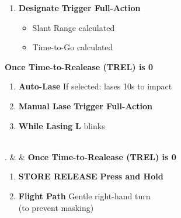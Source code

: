 \documentclass[fontInter]{TechCheck}
\begin{document}
\begin{listlongtable}
		\begin{minipage}[t]{\linewidth}
			\vspace{-7pt}
			\begin{enumerate}
				\item \textbf{Designate} \dotfill \textbf{Trigger Full-Action}
				\begin{itemize}
					\item Slant Range calculated
					\item Time-to-Go calculated
				\end{itemize}
			\end{enumerate}
			\textbf{Once Time-to-Realease (TREL) is 0}
			\begin{enumerate}[label=(\alph*), resume]
				\item \textbf{Auto-Lase} \dotfill If selected: lases 10s to impact
				\item \textbf{Manual Lase} \dotfill \textbf{Trigger Full-Action}
				\item \textbf{While Lasing} \dotfill \textbf{L} blinks
			\end{enumerate}
		\end{minipage} \\
		. &  & \textbf{Once Time-to-Realease (TREL) is 0}
		\begin{minipage}[t]{\linewidth}
			\vspace{-7pt}
			\begin{enumerate}
				\item \textbf{STORE RELEASE} \dotfill \textbf{Press and Hold}
				\item \textbf{Flight Path} \dotfill Gentle right-hand turn \\
				\hfill (to prevent masking)
			\end{enumerate}
		\end{minipage} \\
	\end{listlongtable}
\end{document}

